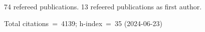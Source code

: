 74 refereed publications. 13 refeered publications as first author.

Total citations~=~4139; h-index~=~35 (2024-06-23)